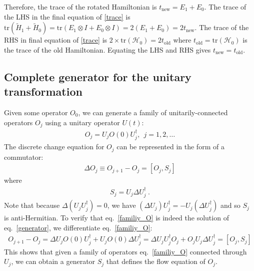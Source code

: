 Therefore, the trace of the rotated Hamiltonian is \(t_\text{new} = E_1 + E_0 \). The trace of the LHS in the final equation of \ref{trace} is \(\text{tr}\left(\tilde H_1 + \tilde H_0\right) = \text{tr}\left(E_1 \otimes I + E_0 \otimes I\right) = 2\left(E_1 + E_0\right) = 2t_\text{new}\). The trace of the RHS in final equation of \ref{trace} is \(2\times\text{tr}\left(\mathcal{H}_0\right) = 2t_\text{old}\) where \(t_\text{old} = \text{tr}\left(\mathcal{H}_0\right)\) is the trace of the old Hamiltonian. Equating the LHS and RHS gives \(t_\text{new} = t_\text{old}\).

\subsection{Complete generator for the unitary transformation}
Given some operator \(O_0\), we can generate a family of unitarily-connected operators \(O_j\) using a unitary operator \(U(t)\):
\begin{equation}\begin{aligned}
	\label{familiy_O}
	O_j = U_j O(0) U_j^\dagger, ~ ~ j = 1,2,\ldots
\end{aligned}\end{equation}
The discrete change equation for \(O_j\) can be represented in the form of a commutator:
\begin{equation}\begin{aligned}
	\label{generator}
	\Delta O_j \equiv O_{j+1} - O_j = \left[O_j, S_j\right] 
\end{aligned}\end{equation}
where 
\begin{equation}\begin{aligned}
	S_j = U_j \Delta U^\dagger_j~.
\end{aligned}\end{equation}
Note that because \(\Delta \left( U_j U_j^\dagger \right) = 0\), we have \(\left(\Delta U_j\right) U_j^\dagger = -U_j\left(\Delta U_j^\dagger\right)\) and so \(S_j\) is anti-Hermitian. To verify that eq.~\ref{familiy_O} is indeed the solution of eq.~\ref{generator}, we differentiate eq.~\ref{familiy_O}:
\begin{equation}\begin{aligned}
	O_{j+1} - O_j = \Delta U_j O(0) U_j^\dagger + U_j O(0) \Delta U_j^\dagger = \Delta U_j U_j^\dagger O_j + O_j U_j \Delta U_j^\dagger = \left[O_j, S_j\right] 
\end{aligned}\end{equation}
This shows that given a family of operators eq.~\ref{familiy_O} connected through \(U_j\), we can obtain a generator \(S_j\) that defines the flow equation of \(O_j\).

